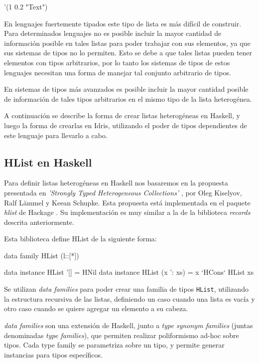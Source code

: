 \begin{code}
'(1 0.2 "Text")
\end{code}

En lenguajes fuertemente tipados este tipo de lista es más difícil de construir. Para determinados lenguajes no es posible incluir la mayor cantidad de información posible en tales listas para poder trabajar con sus elementos, ya que sus sistemas de tipos no lo permiten. Esto se debe a que tales listas pueden tener elementos con tipos arbitrarios, por lo tanto los sistemas de tipos de estos lenguajes necesitan una forma de manejar tal conjunto arbitrario de tipos.

En sistemas de tipos más avanzados es posible incluir la mayor cantidad posible de información de tales tipos arbitrarios en el mismo tipo de la lista heterogénea.

A continuación se describe la forma de crear listas heterogéneas en Haskell, y luego la forma de crearlas en Idris, utilizando el poder de tipos dependientes de este lenguaje para llevarlo a cabo.

\subsection{HList en Haskell}

Para definir listas heterogéneas en Haskell nos basaremos en la propuesta presentada en \textit{'Strongly Typed Heterogeneous Collections'} \cite{Kiselyov:2004:STH:1017472.1017488}, por Oleg Kiselyov, Ralf L\"{a}mmel y Keean Schupke. Esta propuesta está implementada en el paquete \textit{hlist} de Hackage \cite{HListHackage}. Su implementación es muy similar a la de la biblioteca \textit{records} descrita anteriormente.

Esta biblioteca define HList de la siguiente forma:

\begin{code}
data family HList (l::[*])

data instance HList '[] = HNil
data instance HList (x ': xs) = x `HCons` HList xs
\end{code}

Se utilizan \textit{data families} para poder crear una familia de tipos \texttt{HList}, utilizando la estructura recursiva de las listas, definiendo un caso cuando una lista es vacía y otro caso cuando se quiere agregar un elemento a su cabeza.

\textit{data families} son una extensión de Haskell, junto a \textit{type synonym families} (juntas denominadas \textit{type families}), que permiten realizar poliformismo ad-hoc sobre tipos. Cada type family se parametriza sobre un tipo, y permite generar instancias para tipos específicos.

